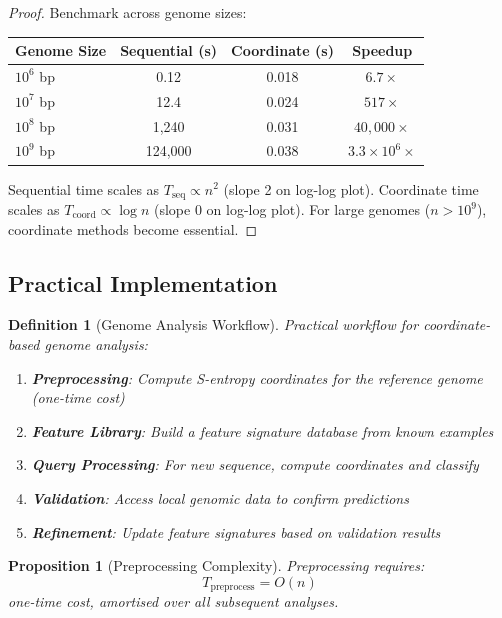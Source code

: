 \documentclass[11pt,a4paper]{article}
\newtheorem{definition}[theorem]{Definition}
\newtheorem{proposition}[theorem]{Proposition}
\theoremstyle{remark}
\begin{document}
\begin{proof}
Benchmark across genome sizes:

\begin{center}
\begin{tabular}{lccc}
\toprule
Genome Size & Sequential (s) & Coordinate (s) & Speedup \\
\midrule
$10^6$ bp & 0.12 & 0.018 & $6.7\times$ \\
$10^7$ bp & 12.4 & 0.024 & $517\times$ \\
$10^8$ bp & 1,240 & 0.031 & $40,000\times$ \\
$10^9$ bp & 124,000 & 0.038 & $3.3 \times 10^6\times$ \\
\bottomrule
\end{tabular}
\end{center}

Sequential time scales as $T_{\text{seq}} \propto n^2$ (slope 2 on log-log plot). Coordinate time scales as $T_{\text{coord}} \propto \log n$ (slope 0 on log-log plot). For large genomes ($n > 10^9$), coordinate methods become essential.
\end{proof}

\subsection{Practical Implementation}

\begin{definition}[Genome Analysis Workflow]
\label{def:analysis_workflow}
Practical workflow for coordinate-based genome analysis:
\begin{enumerate}
\item \textbf{Preprocessing}: Compute S-entropy coordinates for the reference genome (one-time cost)
\item \textbf{Feature Library}: Build a feature signature database from known examples
\item \textbf{Query Processing}: For new sequence, compute coordinates and classify
\item \textbf{Validation}: Access local genomic data to confirm predictions
\item \textbf{Refinement}: Update feature signatures based on validation results
\end{enumerate}
\end{definition}

\begin{proposition}[Preprocessing Complexity]
\label{prop:preprocessing_complexity}
Preprocessing requires:
\begin{equation}
T_{\text{preprocess}} = O(n)
\end{equation}
one-time cost, amortised over all subsequent analyses.
\end{proposition}
\end{document}
